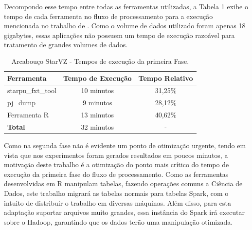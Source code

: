Decompondo esse tempo entre todas as ferramentas utilizadas, a Tabela 
\ref{tab:exectimes} exibe o tempo de cada ferramenta no fluxo de processamento 
para a execução mencionada no trabalho de \citet{ref:starvz}. Como o volume de 
dados utilizado foram apenas 18 gigabytes, essas aplicações não possuem um tempo 
de execução razoável para tratamento de grandes volumes de dados.

\begin{table}[H]
\centering
\small
\begin{tabular}{l c c} \toprule
\textbf{Ferramenta}  &  \textbf{Tempo de Execução}  & \textbf{Tempo Relativo}\\ \midrule
starpu\_fxt\_tool     & 10 minutos   & 31,25\%  \\
pj\_dump            & 9 minutos    & 28,12\%     \\
Ferramenta R        & 13 minutos   & 40,62\%      \\
\textbf{Total}     & 32 minutos & -
\end{tabular}
\caption{Arcabouço StarVZ - Tempos de execução da primeira Fase.}
\label{tab:exectimes}
\end{table}

Como na segunda fase não é evidente um ponto de otimização urgente, tendo em 
vista que nos experimentos foram gerados resultados em poucos minutos, a 
motivação deste trabalho é a otimização do ponto mais crítico do tempo de 
execução da primeira fase do fluxo de processamento. Como as ferramentas 
desenvolvidas em R manipulam tabelas, fazendo operações comuns a Ciência de 
Dados, este trabalho migrará as tabelas normais para tabelas Spark, com o 
intuito de distribuir o trabalho em diversas máquinas. Além disso, para esta 
adaptação suportar arquivos muito grandes, essa instância do Spark irá
executar sobre o Hadoop, garantindo que os dados terão uma manipulação 
otimizada.